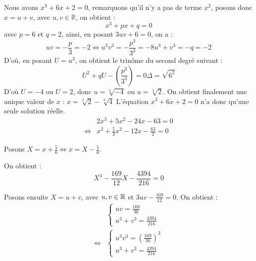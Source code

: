 \documentclass[]{../templates/homework}
\begin{document}
Nous avons $x^3 + 6x + 2 =0$, remarquons qu'il n'y a pas de terme $x^2$, posons donc $x = u+v$, avec $u,v \in \mathbb R$, on obtient :
$$x^3 + px + q = 0$$
avec $p=6$ et $q=2$, ainsi, en posant $3uv + 6 = 0$, on a :
\begin{equation}
uv = -\frac{p}{3} = -2 \iff u^3v^3 = -\frac{p^3}{3^3}= -8
u^3 + v^3 = -q = -2
\end{equation}
D'où, en posant $U = u^3$, on obtient le trinôme du second degré suivant : 
\begin{equation}
U^2 + qU - \left(\frac{p^3}{3^3}\right)=0
\Delta = \sqrt{6^2}
\end{equation}
D'où $U=-4$ ou $U=2$, donc $u=\sqrt[3]{-4}$ ou $u=\sqrt[3]{2}$.
On obtient finalement une unique valeur de $x$ : $x=\sqrt[3]{2}-\sqrt[3]{4}$
L'équation $x^3 + 6x + 2=0$ n'a donc qu'une seule solution réelle. 
\begin{align*}
	& 2x^3 + 5x^2 - 24x - 63 = 0 \\
	\iff & x^3 + \frac{5}{2}x^2 - 12x - \frac{63}{2} = 0
\end{align*}

Posons $X = x + \frac{5}{6} \iff x = X - \frac{5}{6}$.

On obtient : $$X^3 - \frac{169}{12}X - \frac{4394}{216} = 0$$

Posons ensuite $X = u + v$, avec $u, v \in \mathbb R$ et $3uv - \frac{169}{12} = 0$. On obtient :
\begin{align*}
	&\begin{cases}
		uv = \frac{169}{36}\\
		u^3 + v^3 = \frac{4394}{216}
	\end{cases} \\
	\iff 
	&\begin{cases}
		u^3v^3 = (\frac{169}{36})^3\\
		u^3 + v^3 = \frac{4394}{216}
	\end{cases}
\end{align*}
\end{document}
